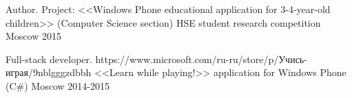 \begin{cventries}
\cventry
{Author. Project: <<Windows Phone educational application for 3-4-year-old children>> (Computer Science section)} %
{HSE student research competition} %
{Moscow} %
{2015} %
{}

\cventry
{Full-stack developer. https://www.microsoft.com/ru-ru/store/p/Учись-играя/9nblgggzdbbh} %
{<<Learn while playing!>> application for Windows Phone  (C\#) } %
{Moscow} %
{2014-2015} %
{}
\end{cventries}